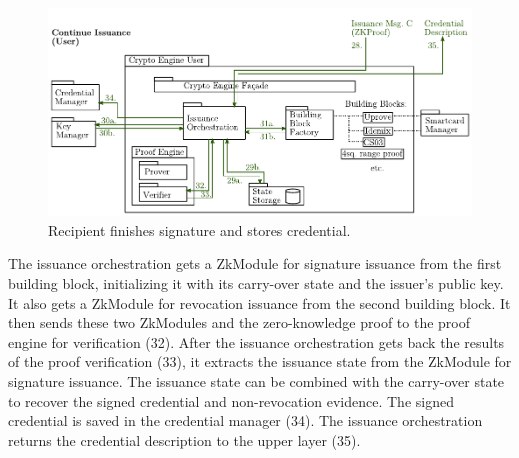 \begin{figure}[htbp]
\includegraphics[width=\textwidth]{img/04.pdf}
\caption{Recipient finishes signature and stores credential.}
\label{fig:issuance4}
\end{figure}

The issuance orchestration gets a ZkModule for signature issuance from the first building block, initializing it with its
carry-over state and the issuer's public key. It also gets a ZkModule for revocation issuance from the second building block.
It then sends these two ZkModules and the zero-knowledge proof to the proof engine for verification (32).
After the issuance orchestration gets back the results of the proof verification (33), it extracts the issuance state from the
ZkModule for signature issuance. 
The issuance state can be combined with the carry-over state to recover the signed credential
and non-revocation evidence. 
The signed credential is saved in the credential manager (34). The issuance orchestration returns
the credential description to the upper layer (35).






